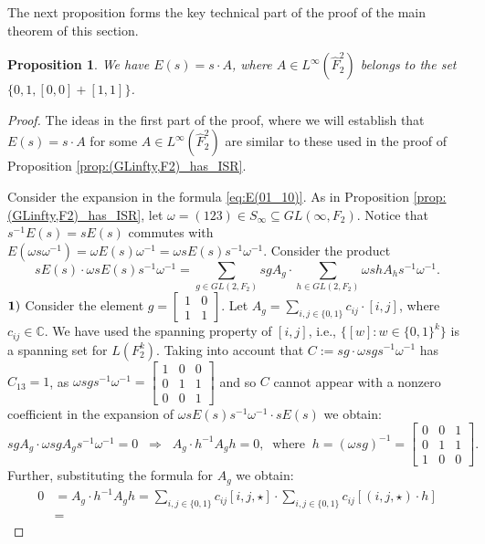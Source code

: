 \documentclass[11pt]{amsart}
\theoremstyle{plain}
\newtheorem{proposition}[theorem]{Proposition}
\theoremstyle{definition}
\theoremstyle{remark}
\numberwithin{equation}{section}
\begin{document}
The next proposition forms the key technical part of the proof of the main theorem of this section.
\begin{proposition}\label{lemma: E(01 10) for cross product}
We have  $E(s)=s\cdot A$, where $A\in  L^\infty(\widehat{ F}_2^2)$ belongs to the set $\{0,1,[0,0]+[1,1]\}$.
\end{proposition}
\begin{proof}
The ideas in the first part of the proof, where we will establish that $E(s) = s \cdot A$ for some $A \in L^\infty(\widehat{ F}_2^2)$  are similar to these used in the proof of Proposition \ref{prop:(GLinfty,F2)_has_ISR}. 

Consider the expansion in the formula \eqref{eq:E(01_10)}. As in Proposition \ref{prop:(GLinfty,F2)_has_ISR}, let $\omega=(123)\in S_\infty\subseteq GL(\infty, F_2)$. Notice that $s^{-1} E(s)=sE(s)$ commutes with $E(\omega s\omega^{-1})=\omega E(s)\omega^{-1}=\omega sE(s)s^{-1}\omega^{-1}$. Consider the product
$$sE(s)\cdot \omega sE(s)s^{-1}\omega^{-1}=\sum\limits_{g\in GL(2, F_2)}sgA_g\cdot \sum\limits_{h\in GL(2, F_2)} \omega shA_hs^{-1}\omega^{-1}.$$
\vskip 0.1cm\noindent
${\bf 1)}$ Consider the element $g=\begin{bmatrix}
	1&0\\1&1
\end{bmatrix}$. Let $A_g=\sum\limits_{i,j\in\{0,1\}}c_{ij}\cdot [i,j]$, where $c_{ij}\in\mathbb C$. We have used the spanning property of $[i,j]$, i.e., $\{[w]: w\in \{0,1\}^k\}$ is a spanning set for $L(F_2^k)$. Taking into account that $C:=sg\cdot \omega sgs^{-1}\omega^{-1}$ has $C_{13}=1$, as  $\omega sgs^{-1}\omega^{-1} = \begin{bmatrix}
	1&0&0\\0&1&1\\0&0&1
\end{bmatrix}$ and so $C$ cannot appear with a nonzero coefficient in the expansion of $\omega sE(s)s^{-1}\omega^{-1}\cdot sE(s)$ we obtain:
$$sgA_g\cdot \omega sgA_gs^{-1}\omega^{-1}=0\;\;\Longrightarrow\;\; A_g\cdot h^{-1} A_gh=0,\;\;\text{where}\;\; h=(\omega sg)^{-1}=\begin{bmatrix}
	0&0&1\\0&1&1\\1&0&0
\end{bmatrix}.$$ 
Further, substituting the formula for $A_g$ we obtain:
\begin{align*}0&=A_g\cdot h^{-1} A_gh=\sum\limits_{i,j\in\{0,1\}}c_{ij}[i,j,\star]\cdot\sum\limits_{i,j\in\{0,1\}}c_{ij}[(i,j,\star)\cdot h]\\&=

\end{align*}
\end{proof}
\end{document}
